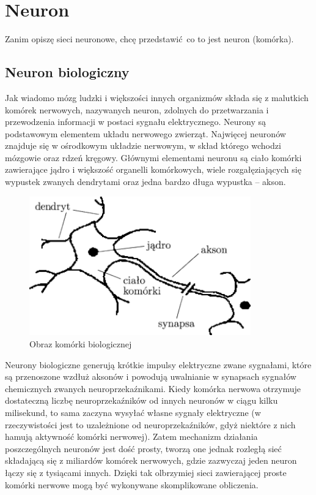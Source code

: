 \documentclass{article}
\begin{document}
\section{Neuron}
Zanim opiszę sieci neuronowe, chcę przedstawić co to jest neuron (komórka).

\subsection{Neuron biologiczny}
Jak wiadomo mózg ludzki i większości innych organizmów składa się z malutkich komórek nerwowych, nazywanych neuron, zdolnych do przetwarzania i przewodzenia informacji w postaci sygnału elektrycznego. Neurony są podstawowym elementem układu nerwowego zwierząt. Najwięcej neuronów znajduje się w ośrodkowym układzie nerwowym, w skład którego wchodzi mózgowie oraz rdzeń kręgowy. \cite{neuroscience}
Głównymi elementami neuronu są ciało komórki zawierające jądro i większość organelli komórkowych, wiele rozgałęziających się wypustek zwanych dendrytami oraz jedna bardzo długa wypustka -- akson. \cite{geron}

\begin{figure}
	\centering
	\includegraphics[width=\textwidth,height=6cm,keepaspectratio=true]{neuron_bio}
	\caption{
		Obraz komórki biologicznej \cite{neuron_bio}
	}
\end{figure}

Neurony biologiczne generują krótkie impulsy elektryczne zwane sygnałami, które są przenoszone wzdłuż aksonów i powodują uwalnianie w synapsach sygnałów chemicznych zwanych neuroprzekaźnikami. Kiedy komórka nerwowa otrzymuje dostateczną liczbę neuroprzekaźników od innych neuronów w ciągu kilku milisekund, to sama zaczyna wysyłać własne sygnały elektryczne (w rzeczywistości jest to uzależnione od neuroprzekaźników, gdyż niektóre z nich hamują aktywność komórki nerwowej). \cite{geron}
Zatem mechanizm działania poszczególnych neuronów jest dość prosty, tworzą one jednak rozległą sieć składającą się z miliardów komórek nerwowych, gdzie zazwyczaj jeden neuron łączy się z tysiącami innych. Dzięki tak olbrzymiej sieci zawierającej proste komórki nerwowe mogą być wykonywane skomplikowane obliczenia.
\end{document}
